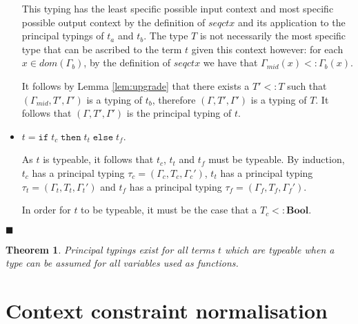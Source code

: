 \documentclass[preprint]{sigplanconf}
\newtheorem{thm}{Theorem}
\newcommand{\lemref}[1]{Lemma \ref{#1}}
\newcommand{\boolt}{\mathbf{Bool}}
\newcommand{\ift}[3]{\mathtt{if} \; #1 \; \mathtt{then} \; #2 \; \mathtt{else} \; #3}
\newcommand{\qed}{$\blacksquare$}
\newenvironment{proof}{\vspace{1ex}\noindent{\bf Proof}\hspace{0.5em}}
  {\hfill\qed\vspace{1ex}}
\begin{document}
\begin{proof}
\begin{itemize}
This typing has the least specific
possible input context and most specific possible output context by the 
definition of $\mathit{seqctx}$ and its
application to the principal typings of $t_a$ and $t_b$. The type $T$ is
not necessarily the most specific type that can be ascribed to the term $t$
given this context however: for each $x \in dom(\Gamma_b)$, by the definition
of $\mathit{seqctx}$ we have that $\Gamma_{mid}(x) <: \Gamma_b(x)$.

It follows by \lemref{lem:upgrade} that there exists a $T' <: T$
such that $(\Gamma_{mid}, T', \Gamma')$ is a typing of
$t_b$, therefore $(\Gamma, T', \Gamma')$ is a typing of $T$. 
It follows that $(\Gamma, T', \Gamma')$
is the principal typing of $t$.


\item $t = \ift{t_c}{t_t}{t_f}$.

As $t$ is typeable, it follows that $t_c$, $t_t$ and $t_f$ must be typeable.
By induction, $t_c$ has a principal typing $\tau_c = (\Gamma_c, T_c, \Gamma_c')$,
$t_t$ has a principal typing $\tau_t = (\Gamma_t, T_t, \Gamma_t')$ and
$t_f$ has a principal typing $\tau_f = (\Gamma_f, T_f, \Gamma_f')$.

In order for $t$ to be typeable, it must be the case that a 
$T_c <: \boolt$.





\end{itemize}
\end{proof}

\begin{thm}
\label{thm:principal}
Principal typings exist for all terms $t$ which
are typeable when a type can be assumed for all variables used as functions.
\end{thm}


\section{Context constraint normalisation}
\label{app:ctx_norm}
\end{document}

